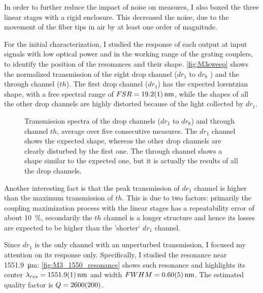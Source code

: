 In order to further reduce the impact of noise on measures, I also boxed the three linear stages with a rigid enclosure.
This decreased the noise, due to the movement of the fiber tips in air by at least one order of magnitude.

For the initial characterization, I studied the response of each output at input signals with low optical power and in the working range of the grating couplers, to identify the position of the resonances and their shape.
\autoref{fig:M3sweep} shows the normalized transmission of the eight drop channel ($dr_1$ to $dr_8$ ) and the through channel ($th$).
The first drop channel ($dr_1$) has the expected lorentzian shape, with a free spectral range of $FSR=\SI{19.2+-.1}{\nm}$, while the shapes of all the other drop channels are highly distorted because of the light collected by $dr_1$.

\begin{figure}[htbp]
	\centering
%	
%	
	
	\caption{
		Transmission spectra of the drop channels ($dr_1$ to $dr_8$) and through channel $th$, average over five consecutive measures.
		The $dr_1$ channel shows the expected shape, whereas the other drop channels are clearly disturbed by the first one.
		The through channel shows a shape similar to the expected one, but it is actually the results of all the drop channels.
	}
	\label{fig:M3sweep}
\end{figure}

Another interesting fact is that the peak transmission of $dr_1$ channel is higher than the maximum transmission of $th$.
This is due to two factors: primarily the coupling maximization process with the linear stages has a repeatability error of about \SI{10}{\percent}, secondarily the $th$ channel is a longer structure and hence its losses are expected to be higher than the 'shorter` $dr_1$ channel.

Since $dr_1$ is the only channel with an unperturbed transmission, I focused my attention on its response only.
Specifically, I studied the resonance near \SI{1551.9}{\um}: %
\autoref{fig:M3_1550_resonance} shows such resonance and highlights its center $\lambda_{res}=\SI{1551.9+-0.1}{\nm}$ and width $FWHM=\SI{0.6+-0.05}{\nm}$.
The estimated quality factor is $Q=\num{2600+-200}$.

